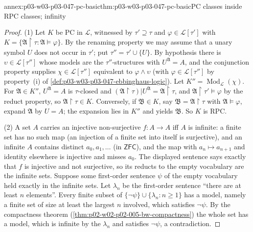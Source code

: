 \begin{annexitem}{annex:p03-w03-p03-047-pc-basic}{thm:p03-w03-p03-047-pc-basic}{PC classes inside RPC classes; infinity}
\begin{proof}
(1) Let \(K\) be PC in \(\mathscr L\), witnessed by \(\tau'\supseteq\tau\)
and \(\varphi\in\mathscr L[\tau']\) with
\(K=\{\mathfrak A\restriction\tau:\mathfrak A\models\varphi\}\).  By the
renaming property we may assume that a unary symbol \(U\) does not occur in
\(\tau'\); put \(\tau''=\tau'\cup\{U\}\).  By hypothesis there is
\(\upsilon\in\mathscr L[\tau'']\) whose models are the
\(\tau''\)-structures with \(U^{\mathfrak A}=A\), and the conjunction
property supplies \(\chi\in\mathscr L[\tau'']\) equivalent to
\(\varphi\land\upsilon\) (with \(\varphi\in\mathscr L[\tau'']\) by
property~(i) of \cref{def:p03-w03-p03-047-ebbinghaus-logic}).  Let
\(K''=\operatorname{Mod}_{\mathscr L}(\chi)\).  For \(\mathfrak A\in K''\),
\(U^{\mathfrak A}=A\) is \(\tau\)-closed and
\((\mathfrak A\restriction\tau)|U^{\mathfrak A}=\mathfrak A\restriction\tau\),
and \(\mathfrak A\restriction\tau'\models\varphi\) by the reduct property, so
\(\mathfrak A\restriction\tau\in K\).  Conversely, if
\(\mathfrak B\in K\), say \(\mathfrak B=\mathfrak A\restriction\tau\) with
\(\mathfrak A\models\varphi\), expand \(\mathfrak A\) by \(U=A\); the
expansion lies in \(K''\) and yields \(\mathfrak B\).  So \(K\) is RPC.

(2) A set \(A\) carries an injective non-surjective \(f:A\to A\) iff \(A\) is
infinite: a finite set has no such map (an injection of a finite set into
itself is surjective), and an infinite \(A\) contains distinct
\(a_0,a_1,\ldots\) (in \(\mathsf{ZFC}\)), and the map with
\(a_n\mapsto a_{n+1}\) and identity elsewhere is injective and misses
\(a_0\).  The displayed sentence says exactly that \(f\) is injective and not
surjective, so its reducts to the empty vocabulary are the infinite sets.
Suppose some first-order sentence \(\psi\) of the empty vocabulary held
exactly in the infinite sets.  Let \(\lambda_n\) be the first-order sentence
``there are at least \(n\) elements''.  Every finite subset of
\(\{\neg\psi\}\cup\{\lambda_n:n\ge1\}\) has a model, namely a finite set
of size at least the largest \(n\) involved, which satisfies \(\neg\psi\).
By the compactness theorem (\cref{thm:p02-w02-p02-005-bw-compactness}) the
whole set has a model, which is infinite by the \(\lambda_n\) and satisfies
\(\neg\psi\), a contradiction.
\end{proof}
\end{annexitem}

